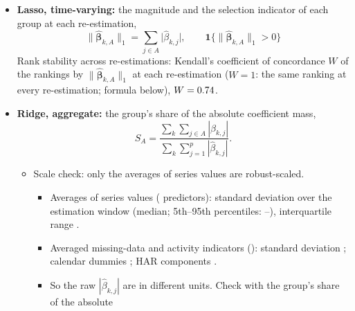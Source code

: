 \begin{itemize}
\begin{itemize}
  \item HAR benchmark block: selected in every re-estimation ($\omega_j = \rhfiBackbonePf$);
    \rhfiLassoBackboneShare\,\% of $\sum_j |\hat\beta_{k,j}|$ (median re-estimation).
  \item Random-probe benchmark: the continuous probe, an i.i.d.\ uniform noise predictor (defined under Known issues),
    is selected in \rhfiLassoProbeRate\,\% of its fits; \rhfiLassoColsAboveProbe{} predictors, in
    \rhfiLassoSeriesAboveProbe{} exogenous series, are selected more often.
  \end{itemize}
\item \textbf{Lasso, time-varying:} the magnitude and the selection indicator of each group at each re-estimation,
  \[
    \lVert\hat{\bm\beta}_{k,A}\rVert_1 = \sum_{j \in A} \bigl|\hat\beta_{k,j}\bigr|, \qquad
    \mathbf{1}\bigl\{\lVert\hat{\bm\beta}_{k,A}\rVert_1 > 0\bigr\}
  \]
  Rank stability across re-estimations: Kendall's coefficient of
  concordance $W$ of the rankings by $\lVert\hat{\bm\beta}_{k,A}\rVert_1$ at each re-estimation ($W = 1$: the same
  ranking at every re-estimation; formula below), $W = 0.74$.
\item \textbf{Ridge, aggregate:} the group's share of the absolute coefficient mass,
  \[
    S_A = \frac{\sum_{k} \sum_{j \in A} |\hat\beta_{k,j}|}{\sum_{k} \sum_{j=1}^{p} |\hat\beta_{k,j}|} .
  \]
  \begin{itemize}
  \item Scale check: only the averages of series values are robust-scaled.
    \begin{itemize}
    \item Averages of series values (\rhfiScaleValueN{} predictors): standard deviation over the estimation window
      \rhfiScaleValueSd{} (median; 5th--95th percentiles: \rhfiScaleValueSdLo--\rhfiScaleValueSdHi), interquartile
      range \rhfiScaleValueIqr.
    \item Averaged missing-data and activity indicators (\rhfiScaleFlagN): standard deviation \rhfiScaleFlagSd;
      calendar dummies \rhfiScaleCalSd; HAR components \rhfiScaleHarSd.
    \item So the raw $|\hat\beta_{k,j}|$ are in different units. Check with the group's share of the absolute

\end{itemize}
\end{itemize}
\end{itemize}
